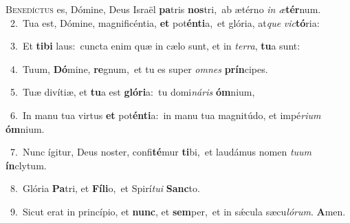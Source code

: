 \lettrine{\initial\textcolor{\initialcolor}{B}}{enedíctus} es, Dómine, Deus Israël \textbf{pa}\-tris \textbf{nos}\-tri,~\star ab ætérno \textit{in} \textit{æ}\-\textbf{tér}num.\\
{\numbfont\textcolor{\numbcolor}{~2.}}~Tua est, Dómine, magnificéntia, \textbf{et} pot\-\textbf{én}\-\textbf{ti}a,~\star et glória, at\textit{que} \textit{vic}\-\textbf{tó}ria:\par
{\numbfont\textcolor{\numbcolor}{~3.}}~Et \textbf{ti}\-\textbf{bi} laus:~\star cuncta enim quæ in cælo sunt, et in \textit{ter}\-\textit{ra}, \textbf{tu}\-a sunt:\par
{\numbfont\textcolor{\numbcolor}{~4.}}~Tuum, \textbf{Dó}\-mine, \textbf{re}\-gnum,~\star et tu es super \textit{om}\-\textit{nes} \textbf{prín}\-cipes.\par
{\numbfont\textcolor{\numbcolor}{~5.}}~Tuæ divítiæ, et \textbf{tu}\-a est \textbf{gló}\-\textbf{ri}a:~\star tu domi\-\textit{ná}\-\textit{ris} \textbf{óm}\-nium,\par
{\numbfont\textcolor{\numbcolor}{~6.}}~In manu tua virtus \textbf{et} pot\-\textbf{én}\-\textbf{ti}a:~\star in manu tua magnitúdo, et impé\-\textit{ri}\-\textit{um} \textbf{óm}\-nium.\par
{\numbfont\textcolor{\numbcolor}{~7.}}~Nunc ígitur, Deus noster, confi\-\textbf{té}\-mur \textbf{ti}\-bi,~\star et laudámus nomen \textit{tu}\-\textit{um} \textbf{ín}\-clytum.\par
{\numbfont\textcolor{\numbcolor}{~8.}}~Glória \textbf{Pa}\-tri, et \textbf{Fí}\-\textbf{li}o,~\star et Spirí\-\textit{tu}\-\textit{i} \textbf{Sanc}\-to.\par
{\numbfont\textcolor{\numbcolor}{~9.}}~Sicut erat in princípio, et \textbf{nunc}\-, et \textbf{sem}\-per,~\star et in sǽcula sæcu\-\textit{ló}\-\textit{rum}. \textbf{A}\-men.\par
